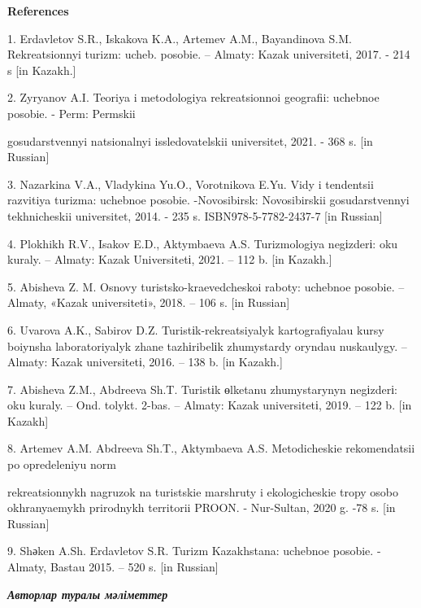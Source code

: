 \begin{center}
{\bfseries References}
\end{center}

\begin{noparindent}
1. Erdavletov S.R., Iskakova K.A., Artem\textquotesingle ev A.M.,
Bayandinova S.M. Rekreatsionnyi turizm: ucheb. posobie. -- Almaty: Kazak
universitetі, 2017. - 214 s {[}in Kazakh.{]}

2. Zyryanov A.I. Teoriya i metodologiya rekreatsionnoi geografii:
uchebnoe posobie. - Perm\textquotesingle: Permskii

gosudarstvennyi
natsional\textquotesingle nyi issledovatel\textquotesingle skii
universitet, 2021. - 368 s. {[}in Russian{]}

3. Nazarkina V.A., Vladykina Yu.O., Vorotnikova E.Yu. Vidy i tendentsii
razvitiya turizma: uchebnoe posobie. -Novosibirsk: Novosibirskii
gosudarstvennyi tekhnicheskii universitet, 2014. - 235 s.
ISBN978-5-7782-2437-7 {[}in Russian{]}

4. Plokhikh R.V., Isakov E.D., Aktymbaeva A.S. Turizmologiya negіzderі:
oku kuraly. -- Almaty: Kazak Universitetі, 2021. -- 112 b. {[}in
Kazakh.{]}

5. Abisheva Z. M. Osnovy turistsko-kraevedcheskoi raboty: uchebnoe
posobie. -- Almaty, «Kazak universitetі», 2018. -- 106 s. {[}in
Russian{]}

6. Uvarova A.K., Sabirov D.Z. Turistіk-rekreatsiyalyk kartografiyalau
kursy boiynsha laboratoriyalyk zhane tazhіribelіk zhumystardy oryndau
nuskaulygy. -- Almaty: Kazak universitetі, 2016. -- 138 b. {[}in
Kazakh.{]}

7. Abisheva Z.M., Abdreeva Sh.T. Turistіk өlketanu zhumystarynyn
negіzderі: oku kuraly. -- Ond. tolykt. 2-bas. -- Almaty: Kazak
universitetі, 2019. -- 122 b. {[}in Kazakh{]}

8. Artem\textquotesingle ev A.M. Abdreeva Sh.T., Aktymbaeva A.S.
Metodicheskie rekomendatsii po opredeleniyu norm

rekreatsionnykh
nagruzok na turistskie marshruty i ekologicheskie tropy osobo
okhranyaemykh prirodnykh territorii PROON. - Nur-Sultan, 2020 g. -78 s.
{[}in Russian{]}

9. Shәken A.Sh. Erdavletov S.R. Turizm Kazakhstana: uchebnoe posobie. -
Almaty, Bastau 2015. -- 520 s. {[}in Russian{]}
\end{noparindent}

\emph{{\bfseries Авторлар туралы мәліметтер}}

